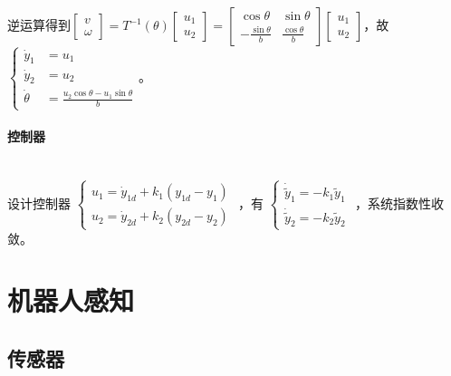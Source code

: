 \documentclass[
12pt, %
a4paper, 
oneside, %
headinclude,footinclude, %
]{scrartcl}
\begin{document}
逆运算得到$ \begin{bmatrix} v \\ \omega \end{bmatrix} = T^{-1}(\theta) \begin{bmatrix} u_1 \\ u_2 \end{bmatrix} = \begin{bmatrix} \cos\theta & \sin\theta \\ -\frac{\sin\theta}{b} & \frac{\cos\theta}{b} \end{bmatrix} \begin{bmatrix} u_1 \\ u_2 \end{bmatrix} $，故%
$
\begin{cases}
\dot{y}_1 &= u_1 \\
\dot{y}_2 &= u_2 \\
\dot{\theta} &= \frac{u_2 \cos\theta - u_1 \sin\theta}{b}
\end{cases}
$。
\paragraph{控制器}~\\

设计控制器
$ 
\begin{cases}
u_1 = \dot{y}_{1d} + k_1(y_{1d} - y_1) \\
u_2 = \dot{y}_{2d} + k_2(y_{2d} - y_2)
\end{cases} 
$%
，有%
$
\begin{cases}
\dot{\tilde{y}}_1 = -k_1\tilde{y}_1 \\
\dot{\tilde{y}}_2 = -k_2\tilde{y}_2
\end{cases}
$%
，系统指数性收敛。
\section{机器人感知}
\subsection[传感器]{传感器}
\end{document}
